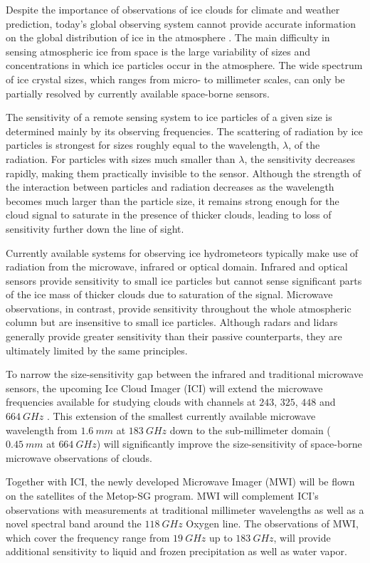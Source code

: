 \documentclass[journal abbreviation, manuscript]{copernicus}
\begin{document}
Despite the importance of observations of ice clouds for climate and weather
prediction, today's global observing system cannot provide accurate information
on the global distribution of ice in the atmosphere
\citep{eliasson11,duncan18a}. The main difficulty in sensing atmospheric ice
from space is the large variability of sizes and concentrations in which ice
particles occur in the atmosphere. The wide spectrum of ice crystal sizes, which
ranges from micro- to millimeter scales, can only be partially resolved by
currently available space-borne sensors.

The sensitivity of a remote sensing system to ice particles of a given size is
determined mainly by its observing frequencies. The scattering of radiation by
ice particles is strongest for sizes roughly equal to the wavelength, $\lambda$,
of the radiation. For particles with sizes much smaller than $\lambda$, the
sensitivity decreases rapidly, making them practically invisible to the sensor.
Although the strength of the interaction between particles and radiation
decreases as the wavelength becomes much larger than the particle size, it
remains strong enough for the cloud signal to saturate in the presence of
thicker clouds, leading to loss of sensitivity further down the line of sight.

Currently available systems for observing ice hydrometeors typically make use of
radiation from the microwave, infrared or optical domain. Infrared and optical
sensors provide sensitivity to small ice particles but cannot sense significant
parts of the ice mass of thicker clouds due to saturation of the signal.
Microwave observations, in contrast, provide sensitivity throughout the whole
atmospheric column but are insensitive to small ice particles. Although radars
and lidars generally provide greater sensitivity than their passive
counterparts, they are ultimately limited by the same principles.

To narrow the size-sensitivity gap between the infrared and traditional microwave
sensors, the upcoming Ice Cloud Imager (ICI) will extend the microwave
frequencies available for studying clouds with channels at $243$, $325$, $448$ and
$664\ \unit{GHz}$ \citep{Eriksson19}. This extension of the smallest currently available microwave
wavelength from $1.6\ \unit{mm}$ at $183\ \unit{GHz}$ down to the sub-millimeter
domain ($0.45\ \unit{mm}$ at $664\ \unit{GHz}$) will significantly improve the
size-sensitivity of space-borne microwave observations of clouds.

Together with ICI, the newly developed Microwave Imager (MWI) will be flown on
the satellites of the Metop-SG program. MWI will complement ICI's observations
with measurements at traditional millimeter wavelengths as well as a novel
spectral band around the $118\ \unit{GHz}$ Oxygen line. The observations of MWI,
which cover the frequency range from $19\ \unit{GHz}$ up to $183\ \unit{GHz}$,
will provide additional sensitivity to liquid and frozen precipitation as well
as water vapor.
\end{document}
